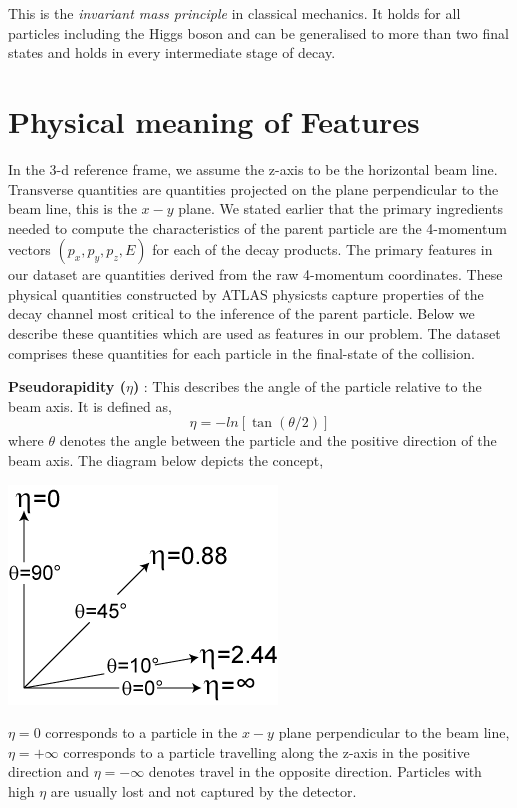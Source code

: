 \documentclass[final,3p,times,twocolumn]{elsarticle}
\begin{document}
This is the \textit{invariant mass principle} in classical mechanics. It holds for all particles including the Higgs boson and can be generalised to more than two final states and holds in every intermediate stage of decay.   


\section{Physical meaning of Features}

\label{Pfeatures}

In the 3-d reference frame, we assume the z-axis to be the horizontal beam line. Transverse quantities are quantities projected on the plane perpendicular to the beam line, this is the $x-y$ plane. We stated earlier that the primary ingredients needed to compute the characteristics of the parent particle are the 4-momentum vectors $(p_{x}, p_{y}, p_{z}, E)$ for each of the decay products. The primary features in our dataset are quantities derived from the raw 4-momentum coordinates. These physical quantities constructed by ATLAS physicsts capture properties of the decay channel most critical to the inference of the parent particle. Below we describe these quantities which are used as features in our problem. The dataset comprises these quantities for each particle in the final-state of the collision. \cite{RM}

\textbf{Pseudorapidity ($\eta$)} : This describes the angle of the particle relative to the beam axis. It is defined as, $$ \eta = -ln [\tan(\theta/2)]$$ where $\theta$ denotes the angle between the particle and the positive direction of the beam axis. The diagram below depicts the concept, 

\begin{center}
\includegraphics[scale=0.7]{Images/Pseudorapidity2.png}
\end{center}

$\eta = 0 $ corresponds to a particle in the $x-y$ plane perpendicular to the beam line, $\eta = +\infty$ corresponds to a particle travelling along the z-axis in the positive direction and $\eta = -\infty$ denotes travel in the opposite direction. Particles with high $\eta$ are usually lost and not captured by the detector. 
\end{document}
